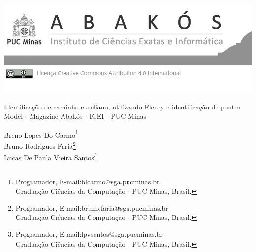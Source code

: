 \documentclass[a4paper,12pt,Times]{article}
\makeatletter
\newcommand{\monog}{Identificação de caminho eureliano, utilizando Fleury e identificação de pontes}
\newcommand{\monogES}{Model - Magazine Abakós - ICEI - PUC Minas}
\newcommand{\origem}{Brasil}
\newcommand{\AutorA}{Breno Lopes Do Carmo}
\newcommand{\funcaoA}{Programador}
\newcommand{\emailA}{blcarmo@sga.pucminas.br}
\newcommand{\cursA}{Graduação Ciências da Computação - PUC Minas}
\newcommand{\AutorB}{Bruno Rodrigues Faria}
\newcommand{\funcaoB}{Programador}
\newcommand{\emailB}{bruno.faria@sga.pucminas.br}
\newcommand{\cursB}{Graduação Ciências da Computação - PUC Minas}
\newcommand{\AutorC}{Lucas De Paula Vieira Santos}
\newcommand{\funcaoC}{Programador}
\newcommand{\emailC}{lpvsantos@sga.pucminas.br}
\newcommand{\cursC}{Graduação Ciências da Computação - PUC Minas}
\newcommand{\keyword}[1]{\textsf{#1}}
\makeatother
\begin{document}

\begin{flushleft}

\begin{minipage} [c][5cm][b]{16.5cm}
\includegraphics[scale=1.1]{figuras/pucmg.png} 
\end{minipage}

 \vspace{0cm} {
 \singlespacing \Large{\monog {} \\ }
  \normalsize{\monogES}
 }
\end{flushleft}
\begin{flushright}
\singlespacing 
\normalsize{\AutorA \footnote{\funcaoA, E-mail:\emailA \\ \cursA, \origem. }} \\
\normalsize{\AutorB \footnote{\funcaoB, E-mail:\emailB \\ \cursB, \origem. }} \\
\normalsize{\AutorC \footnote{\funcaoC, E-mail:\emailC \\ \cursC, \origem. }} \\
\end{flushright}
\thispagestyle{empty}

\begin{abstract}
\noindent
O artigo trata da identificação de caminho eureliano utilizando a identificação de pontes usando dois algoritmos, o algoritmo Naive e o \cite{tarjan}, para que possa ser analisado a diferença entre esses algoritmos e o seu tempo de execução, para N quantidade de vértices. Diante disso, foram utilizados os algoritmos de identificação de pontes para identificar um caminho euleriano em um grafo qualquer, onde esses grafos quaisquer são criados de forma aleatória sendo eles, eulerianos, semi-euleriano e não euleriano, levando em consideração um  grafo  simples  não-direcionado G=(V, E), em que V representa o conjunto de vértices e E o conjunto de arestas.
\\\textbf{\keyword{Palavras-chave: }}Grafos. Pontes. Busca. Euleriano. Complexidade. Naive. Tarjan. 
\end{abstract}
\end{document}
